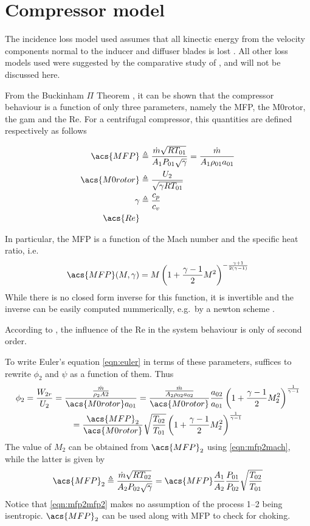 \documentclass[tcc]{subfiles}
\begin{document}
\section{Compressor model}

The incidence loss model used assumes that all kinectic energy from the velocity components
normal to the inducer and diffuser blades is lost \cite{Stanitz1953}.
All other loss models used were suggested by the comparative study of \textcite{Oh1997}, 
and will not be discussed here.



From the Buckinham $\Pi$ Theorem \cite{Buckingham1914}, 
it can be shown that the compressor behaviour is a function of only three parameters, 
namely the \acl{MFP}, the \acl{M0rotor}, the \acl{gam} and the \acl{Re}. 
For a centrifugal compressor, this quantities are defined respectively as follows

\begin{align}
    \acs{MFP} &\triangleq \MFP{1} = \MFPalt{1} \\
    \acs{M0rotor} &\triangleq \frac{U_2}{\sqrt{\gamma R T_{01}}} \\
    \gamma &\triangleq \frac{c_p}{c_v} \\
    \acs{Re} &
\end{align}

In particular, the \acl{MFP} is a function of the Mach number and the specific heat ratio,
 i.e.\
\begin{equation}
    \label{eqn:mfp2mach}
    \acs{MFP}(M,\gamma) = M \left( 1 + \frac{\gamma-1}{2}M^2\right)^{-\frac{\gamma+1}{2(\gamma-1)}}
\end{equation}
While there is no closed form inverse for this function, it is invertible and the inverse can be easily computed nummerically, e.g.\ by a newton scheme \cite{Der1974}.

According to \textcite{walsh2004gas},
 the influence of the \acl{Re} in the system behaviour is only of second order.

To write Euler's equation \cref{eqn:euler} in terms of these parameters, suffices to rewrite $\phi_2$ and $\psi$ as a function of them. Thus
\begin{multline}
    \label{eqn:phi2_dimensionless}
    \phi_2 = \frac{W_{2r}}{U_2} 
           = \frac{\frac{\dot{m}}{\rho_2 A2}}{\acs{M0rotor} a_{01}}
           = \frac{\MFPalt{2}}{\acs{M0rotor}} \frac{a_{02}}{a_{01}} \stagdensratio{2} \\ 
           = \frac{\acs{MFP}_2}{\acs{M0rotor}} \sqrt{\frac{T_{02}}{T_{01}}} \stagdensratio{2}
\end{multline}
The value of $M_2$ can be obtained from $\acs{MFP}_2$ using \cref{eqn:mfp2mach}, while the latter is given by
\begin{equation}
    \label{eqn:mfp2mfp2}
    \acs{MFP}_2 \triangleq \MFP{2} = \acs{MFP} \frac{A_1}{A_2} \frac{P_{01}}{P_{02}} \sqrt{\frac{T_{02}}{T_{01}}}
\end{equation}
Notice that \cref{eqn:mfp2mfp2} makes no assumption of the process 1--2 being isentropic. $\acs{MFP}_2$ can be used along with \acs{MFP} to check for choking.
\end{document}
